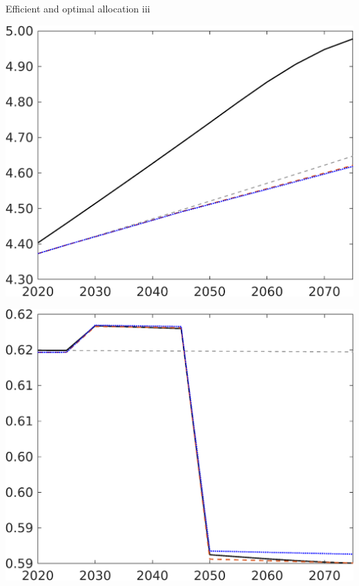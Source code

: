 \documentclass[11pt,aspectratio=169]{beamer}
\begin{document}
\begin{frame}{Efficient and optimal allocation iii}
\begin{minipage}[]{0.3\textwidth}
	\end{minipage}
	\begin{minipage}[]{0.3\textwidth}
		\includegraphics[width=1\textwidth]{../codding_model/own_basedOnFried/optimalPol_elastS_DisuSci/figures/all_1705/An_CompEffOPT_T_NoTaus_spillover0_noskill0_sep1_BN0_ineq0_red0_xgrowth0_zero0_countec0_etaa0.79_lgd0_lff1.png}
	\end{minipage}
	\begin{minipage}[]{0.3\textwidth}
		\includegraphics[width=1\textwidth]{../codding_model/own_basedOnFried/optimalPol_elastS_DisuSci/figures/all_1705/CY_CompEffOPT_T_NoTaus_spillover0_noskill0_sep1_BN0_ineq0_red0_xgrowth0_zero0_countec0_etaa0.79_lgd0_lff1.png}

\end{minipage}
\end{frame}
\end{document}
